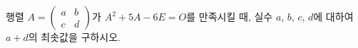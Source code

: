 \hspace*{2mm}\begin{minipage}[t]{\dimexpr\linewidth-2mm\relax}\vspace{0pt}
행렬 $A=\begin{pmatrix} a & b \\ c & d \end{pmatrix}$가 $A^2+5A-6E=O$를 만족시킬 때, 실수 $a$, $b$, $c$, $d$에 대하여 $a+d$의 최솟값을 구하시오.\end{minipage}

